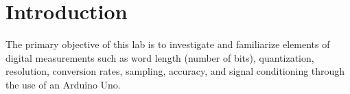 \section{Introduction}

The primary objective of this lab is to investigate and familiarize elements of digital measurements such as 
word length (number of bits), quantization, resolution, conversion rates, sampling, accuracy, and signal conditioning through the use of an Arduino Uno. 


